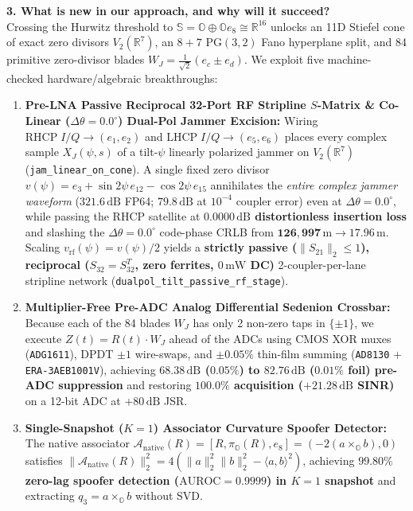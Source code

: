 \documentclass[10pt,a4paper]{article}
\newcommand{\R}{\mathbb{R}}
\newcommand{\Oc}{\mathbb{O}}
\newcommand{\Se}{\mathbb{S}}
\newcommand{\PG}{\mathrm{PG}}
\begin{document}
\textbf{3. What is new in our approach, and why will it succeed?}\\
Crossing the Hurwitz threshold to $\Se = \Oc \oplus \Oc e_8 \cong \R^{16}$ unlocks an 11D Stiefel cone of exact zero divisors $V_2(\R^7)$, an $8+7$ $\PG(3,2)$ Fano hyperplane split, and 84 primitive zero-divisor blades $W_J = \frac{1}{\sqrt{2}}(e_c \pm e_d)$. We exploit five machine-checked hardware/algebraic breakthroughs:
\begin{enumerate}
    \item \textbf{Pre-LNA Passive Reciprocal 32-Port RF Stripline $S$-Matrix \& Co-Linear ($\Delta\theta = 0.0^\circ$) Dual-Pol Jammer Excision:} Wiring $\mathrm{RHCP}\;I/Q \to (e_1, e_2)$ and $\mathrm{LHCP}\;I/Q \to (e_5, e_6)$ places every complex sample $X_J(\psi, s)$ of a tilt-$\psi$ linearly polarized jammer on $V_2(\R^7)$ (\texttt{jam\_linear\_on\_cone}). A single fixed zero divisor $v(\psi) = e_3 + \sin 2\psi\,e_{12} - \cos 2\psi\,e_{15}$ annihilates the \emph{entire complex jammer waveform} ($321.6\,\mathrm{dB}$ FP64; $79.8\,\mathrm{dB}$ at $10^{-4}$ coupler error) even at $\Delta\theta = 0.0^\circ$, while passing the RHCP satellite at \textbf{$0.0000\,\mathrm{dB}$ distortionless insertion loss} and slashing the $\Delta\theta = 0.0^\circ$ code-phase CRLB from $\mathbf{126{,}997\,\mathrm{m} \to 17.96\,\mathrm{m}}$. Scaling $v_{\mathrm{rf}}(\psi) = v(\psi)/2$ yields a \textbf{strictly passive ($\|S_{21}\|_2 \le 1$), reciprocal ($S_{32} = S_{32}^T$, zero ferrites, $0\,\mathrm{mW}$ DC)} 2-coupler-per-lane stripline network (\texttt{dualpol\_tilt\_passive\_rf\_stage}).
    \item \textbf{Multiplier-Free Pre-ADC Analog Differential Sedenion Crossbar:} Because each of the 84 blades $W_J$ has only 2 non-zero taps in $\{\pm 1\}$, we execute $Z(t) = R(t)\cdot W_J$ ahead of the ADCs using CMOS XOR muxes (\texttt{ADG1611}), DPDT $\pm 1$ wire-swaps, and $\pm 0.05\%$ thin-film summing (\texttt{AD8130} + \texttt{ERA-3AEB1001V}), achieving \textbf{$68.38\,\mathrm{dB}$ ($0.05\%$) to $82.76\,\mathrm{dB}$ ($0.01\%$ foil) pre-ADC suppression} and restoring \textbf{$100.0\%$ acquisition ($+21.28\,\mathrm{dB}$ SINR)} on a 12-bit ADC at $+80\,\mathrm{dB}$ JSR.
    \item \textbf{Single-Snapshot ($K=1$) Associator Curvature Spoofer Detector:} The native associator $\mathcal{A}_{\mathrm{native}}(R) = [R, \pi_{\Oc}(R), e_8] = (-2(a\times_{\Oc} b), 0)$ satisfies $\|\mathcal{A}_{\mathrm{native}}(R)\|_2^2 = 4(\|a\|_2^2\|b\|_2^2 - \langle a,b\rangle^2)$, achieving \textbf{$99.80\%$ zero-lag spoofer detection ($\mathrm{AUROC}=0.9999$) in $K=1$ snapshot} and extracting $q_3 = a\times_{\Oc} b$ without SVD.

\end{enumerate}
\end{document}
